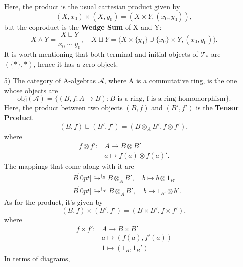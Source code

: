 \documentclass[../category_theory.tex]{subfiles}
\begin{document}
\begin{example}
\begin{itemize}
		      Here, the product is the usual cartesian product given by
		      \[
			      (X, x_{0})\times (X, y_{0})=(X\times Y, (x_{0}, y_{0})),
		      \]
		      but the coproduct is the \textbf{Wedge Sum} of X and Y:
		      \[
			      X\wedge Y = \frac{X \sqcup Y}{x_{0}\sim y_{0}},\quad X\sqcup Y =\bigl(X\times \{y_{0}\} \cup \{x_{0}\}\times Y, (x_{0}, y_{0})\bigr).
		      \]
		      It is worth mentioning that both terminal and initial objects of \(\mathcal{T}_{*}\) are \((\{*\}, *)\), hence it has a zero object.
		\item[5)] The category of A-algebras \(\mathcal{A}\), where A is a commutative ring, is the one whose objects are
		      \[
			      \mathrm{obj}(\mathcal{A})=\{(B, f:A\rightarrow B): B\text{ is a ring, f is a ring homomorphism}\}.
		      \]
		      Here, the product between two objects \((B, f)\) and \((B', f')\) is the \textbf{Tensor Product}
		      \[
			      (B, f)\sqcup (B', f')=(B \otimes_{A} B', f \otimes f'),
		      \]
		      where
		      \begin{align*}
			      f \otimes f': & A\rightarrow B\otimes B'    \\
			                    & a\mapsto f(a)\otimes f(a)'.
		      \end{align*}
		      The mappings that come along with it are
		      \begin{align*}
			       & B\overbracket[0pt]{\hookrightarrow}^{i_{B} }B\otimes _A B',\quad b\mapsto b\otimes 1_{B'}    \\
			       & B\overbracket[0pt]{\hookrightarrow}^{i_{B'} }B\otimes _A B',\quad b\mapsto 1_{B'}\otimes b'.
		      \end{align*}
		      As for the product, it's given by
		      \[
			      (B, f)\times (B', f') = (B\times B', f\times f'),
		      \]
		      where
		      \begin{align*}
			      f\times f': & A\rightarrow B\times B' \\
			                  & a\mapsto (f(a), f'(a))  \\
			                  & 1\mapsto (1_B, 1_B')
		      \end{align*}
		      In terms of diagrams,
		      \begin{center}
\end{center}
\end{itemize}
\end{example}
\end{document}
